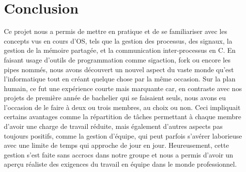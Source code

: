 \documentclass[utf8]{article}
\begin{document}
\newpage
\section{Conclusion}
Ce projet nous a permis de mettre en pratique et de se familiariser avec les concepts vus en cours d'OS, tels que la gestion des processus, des signaux, la gestion 
de la mémoire partagée, et la communication inter-processus en C. En faisant usage d'outils de programmation comme sigaction, fork ou encore les pipes nommés, nous 
avons découvert un nouvel aspect du vaste monde qu'est l'informatique tout en créant quelque chose par la même occasion. Sur la plan humain, ce fut une expérience courte
mais marquante car, en contraste avec nos projets de première année de bachelier qui se faisaient seuls, nous avons eu l'occasion de le faire à deux ou trois membres, au 
choix ou non. Ceci impliquait certains avantages comme la répartition de tâches permettant à chaque membre d'avoir une charge de travail réduite, mais également d'autres 
aspects pas toujours positifs, comme la gestion d'équipe, qui peut parfois s'avérer laborieuse avec une limite de temps qui approche de jour en jour. Heureusement, cette 
gestion s'est faite sans accrocs dans notre groupe et nous a permis d'avoir un aperçu réaliste des exigences du travail en équipe dans le monde professionnel.
\end{document}
